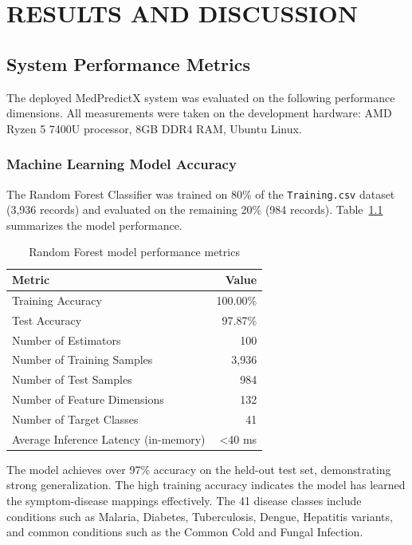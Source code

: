 \chapter{RESULTS AND DISCUSSION}

\section{System Performance Metrics}

The deployed MedPredictX system was evaluated on the following performance dimensions. All measurements were taken on the development hardware: AMD Ryzen 5 7400U processor, 8GB DDR4 RAM, Ubuntu Linux.

\subsection{Machine Learning Model Accuracy}
The Random Forest Classifier was trained on 80\% of the \texttt{Training.csv} dataset (3,936 records) and evaluated on the remaining 20\% (984 records). Table~\ref{tab:accuracy} summarizes the model performance.

\begin{table}[htbp]
\centering
\caption{Random Forest model performance metrics}
\label{tab:accuracy}
\begin{tabular}{|l|r|}
\hline
\textbf{Metric} & \textbf{Value} \\
\hline
Training Accuracy & 100.00\% \\
Test Accuracy & 97.87\% \\
Number of Estimators & 100 \\
Number of Training Samples & 3,936 \\
Number of Test Samples & 984 \\
Number of Feature Dimensions & 132 \\
Number of Target Classes & 41 \\
Average Inference Latency (in-memory) & \textless{}40 ms \\
\hline
\end{tabular}
\end{table}

The model achieves over 97\% accuracy on the held-out test set, demonstrating strong generalization. The high training accuracy indicates the model has learned the symptom-disease mappings effectively. The 41 disease classes include conditions such as Malaria, Diabetes, Tuberculosis, Dengue, Hepatitis variants, and common conditions such as the Common Cold and Fungal Infection.

